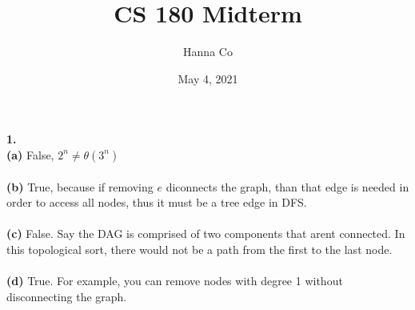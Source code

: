 \documentclass[10pt, letterpaper]{report}
\title{CS 180 Midterm}
\author{Hanna Co}
\date{May 4, 2021}
\begin{document}
\maketitle
\noindent \large{\textbf{1.} } \\
\textbf{(a)} False, \(2^n \neq \theta(3^n)\) \\
\\
\textbf{(b)} True, because if removing $e$ diconnects the graph, than that edge is needed in order to access all nodes, thus it must be a tree edge in DFS. \\
\\
\textbf{(c)} False. Say the DAG is comprised of two components that arent connected. In this topological sort, there would not be a path from the first to the last node. \\
\\
\textbf{(d)} True. For example, you can remove nodes with degree 1 without disconnecting the graph.
\end{document}

